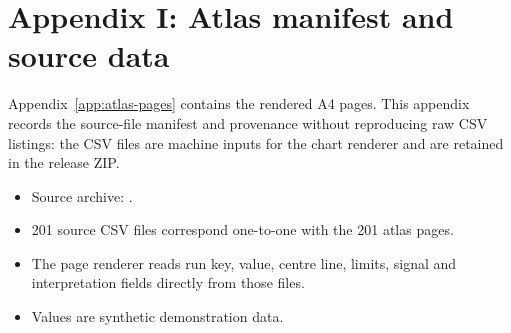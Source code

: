 \chapter{Appendix I: Atlas manifest and source data}
\label{app:atlas-data}

Appendix~\ref{app:atlas-pages} contains the rendered A4 pages. This appendix records the source-file manifest and provenance without reproducing raw CSV listings: the CSV files are machine inputs for the chart renderer and are retained in the release ZIP.

\begin{itemize}
\item Source archive: .
\item 201 source CSV files correspond one-to-one with the 201 atlas pages.
\item The page renderer reads run key, value, centre line, limits, signal and interpretation fields directly from those files.
\item Values are synthetic demonstration data.
\end{itemize}

